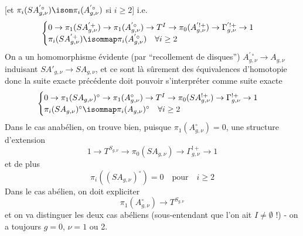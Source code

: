 [et $\pi_i(SA^{'\circ}_{g, \nu}) \isom \pi_i(A^{'\circ}_{g, \nu})$ si $i \geq 2$]
i.e.
$$
\begin{cases}
0 \to \pi_1(SA^{'+}_{g, \nu}) \to \pi_1(A^{'\circ}_{g, \nu}) \to T^I \to \pi_0(A^{'!+}_{g, \nu}) \to \Gamma^{'!+}_{g, \nu} \to 1 \\
\pi_i(SA^{'+}_{g, \nu}) \isommap \pi_i(A^{'\circ}_{g, \nu}) \quad \forall i \geq 2
\end{cases}
$$
On a un homomorphisme évidente (par ``recollement de disques'') $A^{'\circ}_{g, \nu} \to A_{g, \nu}$ induisant $SA'_{g, \nu} \to SA_{g, \nu}$, et ce sont là sûrement des équivalences d'homotopie donc la suite exacte précédente doit pouvoir s'interpréter comme suite exacte
$$
\begin{cases}
0 \to \pi_1(SA_{g, \nu})^\circ \to \pi_1(A^\circ_{g, \nu}) \to T^I \to \pi_0 (SA^{!+}_{g, \nu}) \to \Gamma^{!+}_{g, \nu} \to 1 \\
\pi_i(SA_{g, \nu})^\circ \isommap \pi_i(A_{g, \nu})^\circ \quad \forall i \geq 2
\end{cases}
$$
Dans le cas anabélien, on trouve bien, puisque $\pi_1(A^\circ_{g, \nu}) = 0$, une structure d'extension
$$
\boxed{1 \to T^{S_{g, \nu}} \to \pi_0(SA_{g, \nu}) \to \Gamma^{!+}_{g, \nu} \to 1}
$$
et de plus 
$$
\pi_i((SA_{g, \nu})^\circ) = 0 \quad \text{pour} \quad i \geq 2
$$
Dans le cas abélien, on doit expliciter
$$
\pi_1(A^\circ_{g, \nu}) \to T^{S_{g, \nu}} 
$$
et on va distinguer les deux cas abéliens (sous-entendant que l'on ait $I \neq \emptyset$ !) - on a toujours $g = 0$, $\nu = 1$ ou 2.

